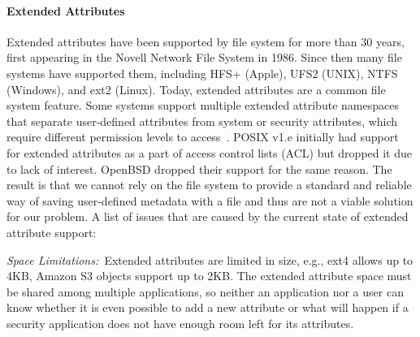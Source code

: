 \paragraph{Extended Attributes}





Extended attributes have been supported by file system for more than 30 years, first appearing in the Novell Network File System in 1986.
Since then many file systems have supported them, including HFS+ (Apple), UFS2 (UNIX), NTFS (Windows), and ext2 (Linux).
Today, extended attributes are a common file system feature.
Some systems support multiple extended attribute namespaces that separate user-defined attributes from system or security attributes,
which require different permission levels to access~\cite{man-xattr}.
POSIX v1.e initially had support for extended attributes as a part of access control lists (ACL) but dropped it due to lack of interest\cite{posix-acl-linux}.
OpenBSD dropped their support for the same reason\cite{extattr-openbsd}.
The result is that we cannot rely on the file system to provide a standard
and reliable way of saving user-defined metadata with a file and thus are not a viable solution for
our problem. A list of issues that are caused by the current state of extended attribute support:

\emph{Space Limitations:\ }Extended attributes are limited in size, e.g., ext4 allows up to 4KB, Amazon S3 objects support up to 2KB. The extended attribute space must be shared among multiple applications, so neither an application nor a user can know whether it is even possible to add a new attribute or what will happen if a security application does not have enough room left for its attributes.

